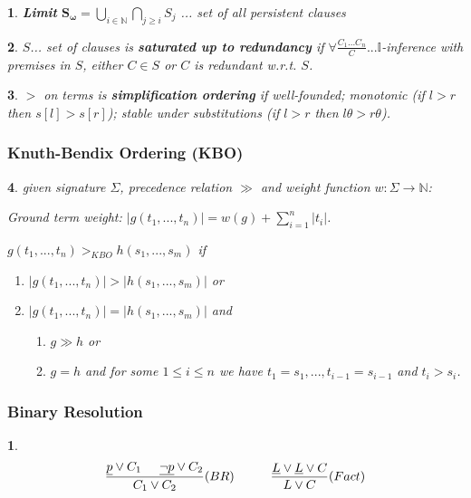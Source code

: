 \documentclass[9pt]{extarticle}
\theoremstyle{theoremstyle}
\newtheorem*{green}{}
\newtheorem*{blue}{}
\begin{document}
\begin{multicols}{3}
\begin{minipage}[t]{.30\textwidth}
\begin{green}
	\textbf{Limit} $\mathbf{S_\omega} = \bigcup_{i\in\mathbb{N}} \bigcap_{j\geq i} S_j$ ... set of all persistent clauses
\end{green}

\begin{green}
	$S$... set of clauses is \textbf{saturated up to redundancy} if $\forall \frac{C_1...C_n}{C} ... \mathbb{I}$-inference with premises in $S$, either $C \in S$ or $C$ is redundant w.r.t. $S$.
\end{green}

\begin{green}
	$>$ on terms is \textbf{simplification ordering} if well-founded; monotonic (if $l>r$ then $s[l]>s[r]$); stable under substitutions (if $l>r$ then $l\theta > r\theta$).
\end{green}

\end{minipage}

\newpage

\begin{minipage}[t]{.30\textwidth}
	
\subsubsection*{Knuth-Bendix Ordering (KBO)}
\begin{green}
	given signature $\Sigma$, precedence relation $\gg$ and weight function $w:\Sigma \rightarrow \mathbb{N}$:
	
	Ground term weight: $|g(t_1,...,t_n)| = w(g)+ \sum_{i=1}^{n}|t_i|$.
	
	$g(t_1,...,t_n) >_{KBO} h(s_1,...,s_m)$ if
	\begin{enumerate}
		\item $|g(t_1,...,t_n)| > |h(s_1,...,s_m)|$ or
		\item $|g(t_1,...,t_n)| = |h(s_1,...,s_m)|$ and
		\begin{enumerate}
			\item $g\gg h$ or
			\item $g=h$ and for some $1 \leq i \leq n$ we have $t_1=s_1,...,t_{i-1}=s_{i-1}$ and $t_i > s_i$.
		\end{enumerate}
	\end{enumerate}
\end{green}
	
\subsubsection*{Binary Resolution}
\begin{blue}
	\begin{align*}
		\frac{\underline{p}\lor C_1 \hspace{.5cm} \underline{\lnot p} \lor C_2}{C_1 \lor C_2} (BR) \hspace{1cm} \frac{\underline{L}\lor \underline{L} \lor C}{L \lor C} (Fact)
	\end{align*}
\end{blue}



\end{minipage}
\end{multicols}
\end{document}
